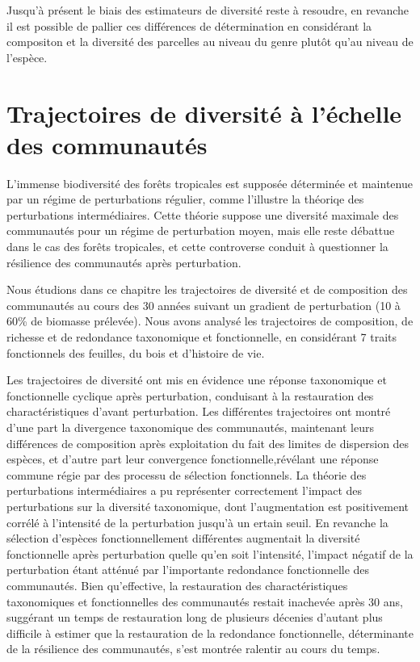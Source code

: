 \documentclass[
  11pt,
  french,
  A4paper,
  extrafontsizes,onecolumn,openright
  ]{memoir}
\begin{document}
Jusqu'à présent le biais des estimateurs de diversité reste à resoudre,
en revanche il est possible de pallier ces différences de détermination
en considérant la compositon et la diversité des parcelles au niveau du
genre plutôt qu'au niveau de l'espèce.

\chapter{Trajectoires de diversité à l'échelle des
communautés}\label{trajectoires-de-diversite-a-lechelle-des-communautes}

L'immense biodiversité des forêts tropicales est supposée déterminée et
maintenue par un régime de perturbations régulier, comme l'illustre la
théoriqe des perturbations intermédiaires. Cette théorie suppose une
diversité maximale des communautés pour un régime de perturbation moyen,
mais elle reste débattue dans le cas des forêts tropicales, et cette
controverse conduit à questionner la résilience des communautés après
perturbation.

Nous étudions dans ce chapitre les trajectoires de diversité et de
composition des communautés au cours des 30 années suivant un gradient
de perturbation (10 à 60\% de biomasse prélevée). Nous avons analysé les
trajectoires de composition, de richesse et de redondance taxonomique et
fonctionnelle, en considérant 7 traits fonctionnels des feuilles, du
bois et d'histoire de vie.

Les trajectoires de diversité ont mis en évidence une réponse
taxonomique et fonctionnelle cyclique après perturbation, conduisant à
la restauration des charactéristiques d'avant perturbation. Les
différentes trajectoires ont montré d'une part la divergence taxonomique
des communautés, maintenant leurs différences de composition après
exploitation du fait des limites de dispersion des espèces, et d'autre
part leur convergence fonctionnelle,révélant une réponse commune régie
par des processu de sélection fonctionnels. La théorie des perturbations
intermédiaires a pu représenter correctement l'impact des perturbations
sur la diversité taxonomique, dont l'augmentation est positivement
corrélé à l'intensité de la perturbation jusqu'à un ertain seuil. En
revanche la sélection d'espèces fonctionnellement différentes augmentait
la diversité fonctionnelle après perturbation quelle qu'en soit
l'intensité, l'impact négatif de la perturbation étant atténué par
l'importante redondance fonctionnelle des communautés. Bien
qu'effective, la restauration des charactéristiques taxonomiques et
fonctionnelles des communautés restait inachevée après 30 ans, suggérant
un temps de restauration long de plusieurs décenies d'autant plus
difficile à estimer que la restauration de la redondance fonctionnelle,
déterminante de la résilience des communautés, s'est montrée ralentir au
cours du temps.
\end{document}
